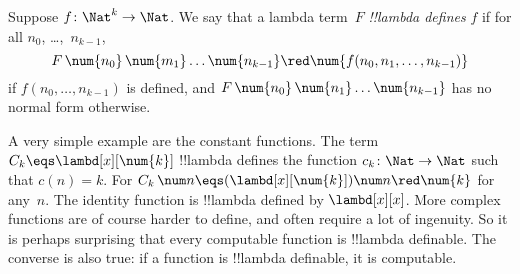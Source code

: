 \documentclass[../../../include/open-logic-section]{subfiles}
\begin{document}
\begin{defn}
Suppose $f\colon \Nat^k \to \Nat$. We say that a lambda term~$F$
\emph{!!{lambda define}s} $f$ if for all 
$n_0$, \dots,~$n_{k-1}$,
\[
F \, \num{n_0} \, \num{m_1} \dots \num{n_{k-1}} \red \num{f(n_0, n_1, \dots,
  n_{k-1})}
\]
if $f(n_0, \dots, n_{k-1})$ is defined, and $F \, \num{n_0} \,
\num{n_1} \dots \num{n_{k-1}}$ has no normal form otherwise.
\end{defn}

A very simple example are the constant functions. The term $C_k \eqs
\lambd[x][\num{k}]$ !!{lambda define}s the function $c_k\colon \Nat \to
\Nat$ such that $c(n) = k$. For $C_k \, \num n \eqs
(\lambd[x][\num{k}])\num n \red \num{k}$ for any~$n$. The identity
function is !!{lambda defined} by $\lambd[x][x]$. More complex
functions are of course harder to define, and often require a lot of
ingenuity. So it is perhaps surprising that every computable function
is !!{lambda definable}. The converse is also true: if a function is
!!{lambda definable}, it is computable.
\end{document}
